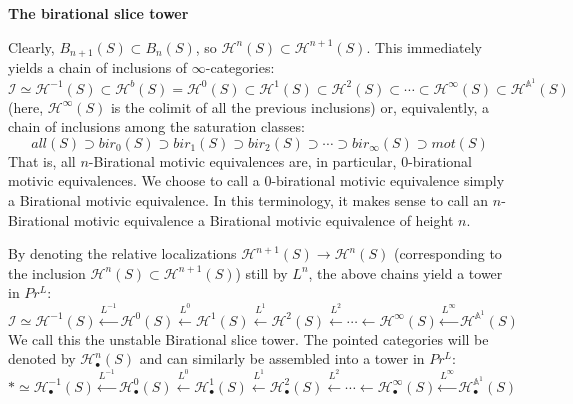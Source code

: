 \textbf{The birational slice tower}\label{bst}

Clearly, $B_{n+1}(S)\subset B_n(S)$, so $\mathcal{H}^{n}(S)\subset \mathcal{H}^{{n+1}}(S)$. This immediately yields a chain of inclusions of $\infty$-categories:
$$\mathcal{I}\simeq \mathcal{H}^{{-1}}(S)\subset \mathcal{H}^{b}(S)=\mathcal{H}^{0}(S)\subset \mathcal{H}^{1}(S)\subset \mathcal{H}^{2}(S)\subset \cdots \subset \mathcal{H}^{\infty}(S)\subset\mathcal{H}^{\mathbb{A}^1}(S) $$
(here, $\mathcal{H}^\infty(S)$ is the colimit of all the previous inclusions) or, equivalently, a chain of inclusions among the saturation classes:
$$all(S)\supset bir_0(S)\supset bir_1(S)\supset bir_2(S)\supset \cdots \supset bir_\infty(S)\supset mot(S) $$
That is, all $n$-Birational motivic equivalences are, in particular, $0$-birational motivic equivalences. We choose to call a $0$-birational motivic equivalence simply a Birational motivic equivalence. In this terminology, it makes sense to call an $n$-Birational motivic equivalence a Birational motivic equivalence of height $n$.


By denoting the relative localizations $\mathcal{H}^{n+1}(S)\to \mathcal{H}^{n}(S)$ (corresponding to the inclusion $\mathcal{H}^n(S)\subset \mathcal{H}^{n+1}(S)$) still by $L^n$, the above chains yield a tower in $Pr^L$:
$$\mathcal{I}\simeq \mathcal{H}^{{-1}}(S)\xleftarrow{L_{}^{-1}}\mathcal{H}^{0}(S)\xleftarrow{L_{}^{0}} \mathcal{H}^{1}(S)\xleftarrow{L_{}^{1}}\mathcal{H}^{2}(S)\xleftarrow{L_{}^{2}} \cdots \leftarrow\mathcal{H}^{\infty}(S)\xleftarrow{L^{\infty}_{}}\mathcal{H}^{\mathbb{A}^1}(S) $$
We call this the unstable Birational slice tower. The pointed categories will be denoted by $\mathcal{H}^n_\bullet (S)$ and can similarly be assembled into a tower in $Pr^L$:
$$*\simeq \mathcal{H}_\bullet^{{-1}}(S)\xleftarrow{L_{}^{-1}}\mathcal{H}_\bullet^{0}(S)\xleftarrow{L_{}^{0}} \mathcal{H}_\bullet^{1}(S)\xleftarrow{L_{}^{1}}\mathcal{H}_\bullet^{2}(S)\xleftarrow{L_{}^{2}} \cdots \leftarrow\mathcal{H}_\bullet^{\infty}(S)\xleftarrow{L^{\infty}_{}}\mathcal{H}_\bullet^{\mathbb{A}^1}(S) $$
